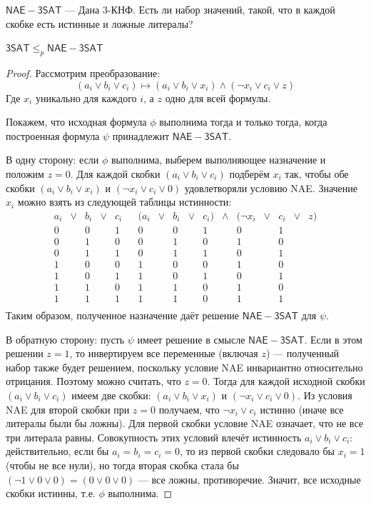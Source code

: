 \begin{definition}
    \(\mathsf{NAE-3SAT}\) --- Дана 3-КНФ. Есть ли набор значений, такой, что в каждой скобке есть истинные и ложные литералы?
\end{definition}

\begin{proposition}
    \(\mathsf{3SAT} \le_p \mathsf{NAE-3SAT}\)
\end{proposition}
\begin{proof}
    Рассмотрим преобразование:
    \[(a_i \vee b_i \vee c_i) \mapsto (a_i \vee b_i \vee x_i) \wedge (\neg x_i \vee c_i \vee z)\]
    Где \(x_i\) уникально для каждого \(i\), а \(z\) одно для всей формулы.

    Покажем, что исходная формула $\phi$ выполнима тогда и только тогда, когда построенная формула $\psi$ принадлежит $\mathsf{NAE-3SAT}$.
    
    В одну сторону: если $\phi$ выполнима, выберем выполняющее назначение и положим $z = 0$. Для каждой скобки $(a_i \vee b_i \vee c_i)$ подберём $x_i$ так, чтобы обе скобки $(a_i \vee b_i \vee x_i)$ и $(\neg x_i \vee c_i \vee 0)$ удовлетворяли условию NAE. Значение \(x_i\) можно взять из следующей таблицы истинности:
    \[\begin{array}{ccccc|cccccccccccc}
        a_i & \vee & b_i & \vee & c_i & & (a_i & \vee & b_i & \vee & c_i) & \wedge & (\neg x_i & \vee & c_i & \vee & z) \\
        \hline
        0 & & 0 & & 1 & & 0 & & 0 & & 1 & & 0 & & 1 & & \\
        0 & & 1 & & 0 & & 0 & & 1 & & 0 & & 1 & & 0 & & \\
        0 & & 1 & & 1 & & 0 & & 1 & & 1 & & 0 & & 1 & & \\
        1 & & 0 & & 0 & & 1 & & 0 & & 0 & & 1 & & 0 & & \\
        1 & & 0 & & 1 & & 1 & & 0 & & 1 & & 0 & & 1 & & \\
        1 & & 1 & & 0 & & 1 & & 1 & & 0 & & 1 & & 0 & & \\
        1 & & 1 & & 1 & & 1 & & 1 & & 0 & & 1 & & 1 & & \\
    \end{array}\]
    Таким образом, полученное назначение даёт решение $\mathsf{NAE-3SAT}$ для $\psi$.
    
    В обратную сторону: пусть $\psi$ имеет решение в смысле $\mathsf{NAE-3SAT}$. Если в этом решении $z = 1$, то инвертируем все переменные (включая $z$) — полученный набор также будет решением, поскольку условие NAE инвариантно относительно отрицания. Поэтому можно считать, что $z = 0$. Тогда для каждой исходной скобки $(a_i \vee b_i \vee c_i)$ имеем две скобки: $(a_i \vee b_i \vee x_i)$ и $(\neg x_i \vee c_i \vee 0)$. Из условия NAE для второй скобки при $z=0$ получаем, что $\neg x_i \vee c_i$ истинно (иначе все литералы были бы ложны). Для первой скобки условие NAE означает, что не все три литерала равны. Совокупность этих условий влечёт истинность $a_i \vee b_i \vee c_i$: действительно, если бы $a_i=b_i=c_i=0$, то из первой скобки следовало бы $x_i=1$ (чтобы не все нули), но тогда вторая скобка стала бы $(\neg 1 \vee 0 \vee 0) = (0 \vee 0 \vee 0)$ — все ложны, противоречие. Значит, все исходные скобки истинны, т.е. $\phi$ выполнима.
    

\end{proof}
